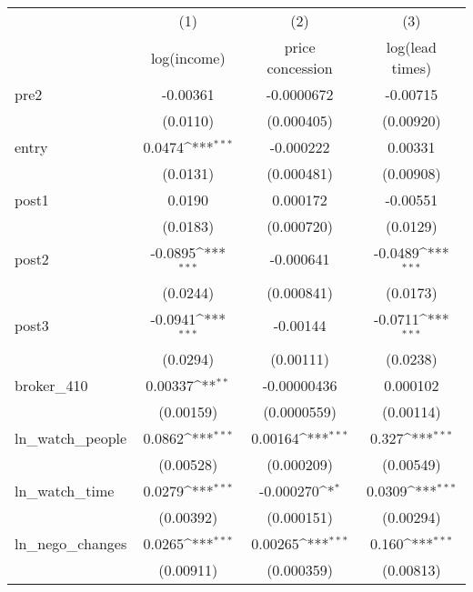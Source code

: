 {
\def\sym#1{\ifmmode^{#1}\else\(^{#1}\)\fi}
\begin{tabular}{l*{3}{c}}
\toprule
            &\multicolumn{1}{c}{(1)}&\multicolumn{1}{c}{(2)}&\multicolumn{1}{c}{(3)}\\
            &\multicolumn{1}{c}{log(income)}&\multicolumn{1}{c}{price concession}&\multicolumn{1}{c}{log(lead times)}\\
\midrule
pre2        &    -0.00361         &  -0.0000672         &    -0.00715         \\
            &    (0.0110)         &  (0.000405)         &   (0.00920)         \\
\addlinespace
entry       &      0.0474\sym{***}&   -0.000222         &     0.00331         \\
            &    (0.0131)         &  (0.000481)         &   (0.00908)         \\
\addlinespace
post1       &      0.0190         &    0.000172         &    -0.00551         \\
            &    (0.0183)         &  (0.000720)         &    (0.0129)         \\
\addlinespace
post2       &     -0.0895\sym{***}&   -0.000641         &     -0.0489\sym{***}\\
            &    (0.0244)         &  (0.000841)         &    (0.0173)         \\
\addlinespace
post3       &     -0.0941\sym{***}&    -0.00144         &     -0.0711\sym{***}\\
            &    (0.0294)         &   (0.00111)         &    (0.0238)         \\
\addlinespace
broker\_410  &     0.00337\sym{**} & -0.00000436         &    0.000102         \\
            &   (0.00159)         & (0.0000559)         &   (0.00114)         \\
\addlinespace
ln\_watch\_people&      0.0862\sym{***}&     0.00164\sym{***}&       0.327\sym{***}\\
            &   (0.00528)         &  (0.000209)         &   (0.00549)         \\
\addlinespace
ln\_watch\_time&      0.0279\sym{***}&   -0.000270\sym{*}  &      0.0309\sym{***}\\
            &   (0.00392)         &  (0.000151)         &   (0.00294)         \\
\addlinespace
ln\_nego\_changes&      0.0265\sym{***}&     0.00265\sym{***}&       0.160\sym{***}\\
            &   (0.00911)         &  (0.000359)         &   (0.00813)         \\

\end{tabular}}
